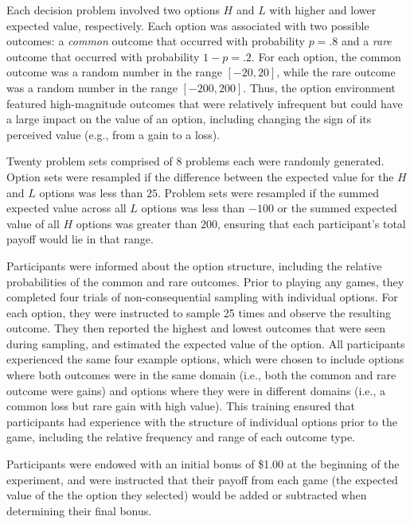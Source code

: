 \documentclass[11pt,jou]{apa6}
\begin{document}
Each decision problem involved two options $H$ and $L$ with higher and lower expected value, respectively.
Each option was associated with two possible outcomes: a \emph{common} outcome that occurred with probability $p = .8$ and a \emph{rare} outcome that occurred with probability $1 - p = .2$.
For each option, the common outcome was a random number in the range $[-20, 20]$, while the rare outcome was a random number in the range $[-200, 200]$.
Thus, the option environment featured high-magnitude outcomes that were relatively infrequent but could have a large impact on the value of an option, including changing the sign of its perceived value (e.g., from a gain to a loss).

Twenty problem sets comprised of 8 problems each were randomly generated.
Option sets were resampled if the difference between the expected value for the $H$ and $L$ options was less than $25$. 
Problem sets were resampled if the summed expected value across all $L$ options was less than $-100$ or the summed expected value of all $H$ options was greater than $200$, ensuring that each participant's total payoff would lie in that range.

Participants were informed about the option structure, including the relative probabilities of the common and rare outcomes.
Prior to playing any games, they completed four trials of non-consequential sampling with individual options.
For each option, they were instructed to sample 25 times and observe the resulting outcome.
They then reported the highest and lowest outcomes that were seen during sampling, and estimated the expected value of the option.
All participants experienced the same four example options, which were chosen to include options where both outcomes were in the same domain (i.e., both the common and rare outcome were gains) and options where they were in different domains (i.e., a common loss but rare gain with high value).
This training ensured that participants had experience with the structure of individual options prior to the game, including the relative frequency and range of each outcome type. 

Participants were endowed with an initial bonus of \$1.00 at the beginning of the experiment, and were instructed that their payoff from each game (the expected value of the the option they selected) would be added or subtracted when determining their final bonus.
\end{document}
